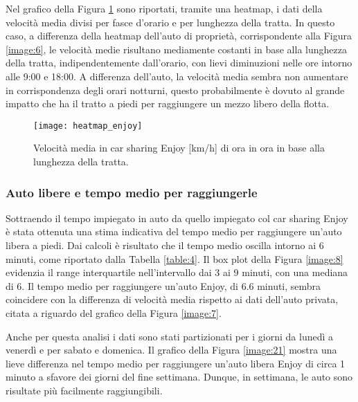 Nel grafico della Figura \ref{image:30} sono riportati, tramite una heatmap, i dati della velocità media divisi per fasce d'orario e per lunghezza della tratta. In questo caso, a differenza della heatmap dell'auto di proprietà, corrispondente alla Figura \ref{image:6}, le velocità medie risultano mediamente costanti in base alla lunghezza della tratta, indipendentemente dall'orario, con lievi diminuzioni nelle ore intorno alle 9:00 e 18:00. A differenza dell'auto, la velocità media sembra non aumentare in corrispondenza degli orari notturni, questo probabilmente è dovuto al grande impatto che ha il tratto a piedi per raggiungere un mezzo libero della flotta.

\begin{figure}
	\centering
	\texttt{[image: heatmap\_enjoy]}
	\caption{Velocità media in car sharing Enjoy [km/h] di ora in ora in base alla lunghezza della tratta.}
	\label{image:30}
\end{figure}

\subsubsection{Auto libere e tempo medio per raggiungerle}

Sottraendo il tempo impiegato in auto da quello impiegato col car sharing Enjoy è stata ottenuta una stima indicativa del tempo medio per raggiungere un'auto libera a piedi. Dai calcoli è risultato che il tempo medio oscilla intorno ai 6 minuti, come riportato dalla Tabella \ref{table:4}. Il box plot della Figura \ref{image:8} evidenzia il range interquartile nell'intervallo dai 3 ai 9 minuti, con una mediana di 6. Il tempo medio per raggiungere un'auto Enjoy, di 6.6 minuti, sembra coincidere con la differenza di velocità media rispetto ai dati dell'auto privata, citata a riguardo del grafico della Figura \ref{image:7}.

Anche per questa analisi i dati sono stati partizionati per i giorni da lunedì a venerdì e per sabato e domenica. Il grafico della Figura \ref{image:21} mostra una lieve differenza nel tempo medio per raggiungere un'auto libera Enjoy di circa 1 minuto a sfavore dei giorni del fine settimana. Dunque, in settimana, le auto sono risultate più facilmente raggiungibili.

